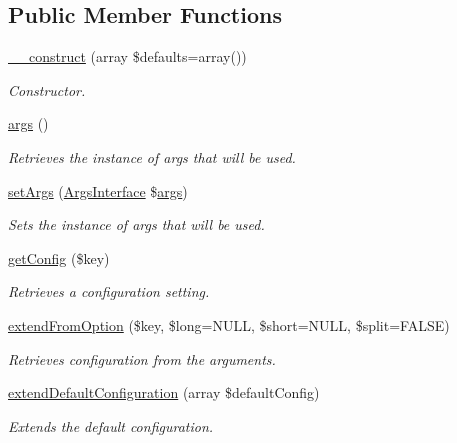 \subsection*{Public Member Functions}
\begin{DoxyCompactItemize}
\item 
\hyperlink{classConfiguration_af063c7baa1b1849330633a8f10bd1dfd}{\-\_\-\-\_\-construct} (array \$defaults=array())
\begin{DoxyCompactList}\small\item\em Constructor. \end{DoxyCompactList}\item 
\hyperlink{classConfiguration_ad064f8385551f9949d659303553395c7}{args} ()
\begin{DoxyCompactList}\small\item\em Retrieves the instance of args that will be used. \end{DoxyCompactList}\item 
\hyperlink{classConfiguration_affa059ec3bfaa3cdcb4177ae1a0b61e0}{set\-Args} (\hyperlink{interfaceArgsInterface}{Args\-Interface} \$\hyperlink{classConfiguration_ad064f8385551f9949d659303553395c7}{args})
\begin{DoxyCompactList}\small\item\em Sets the instance of args that will be used. \end{DoxyCompactList}\item 
\hyperlink{classConfiguration_a6ba7a36ac889882a8711ee7388af2609}{get\-Config} (\$key)
\begin{DoxyCompactList}\small\item\em Retrieves a configuration setting. \end{DoxyCompactList}\item 
\hyperlink{classConfiguration_a5dd09b0016a43624c98bab1241e9c0da}{extend\-From\-Option} (\$key, \$long=N\-U\-L\-L, \$short=N\-U\-L\-L, \$split=F\-A\-L\-S\-E)
\begin{DoxyCompactList}\small\item\em Retrieves configuration from the arguments. \end{DoxyCompactList}\item 
\hyperlink{classConfiguration_a60ba070c68333cb81c979ce4d27b7f2b}{extend\-Default\-Configuration} (array \$default\-Config)
\begin{DoxyCompactList}\small\item\em Extends the default configuration. \end{DoxyCompactList}\item 

\end{DoxyCompactItemize}
